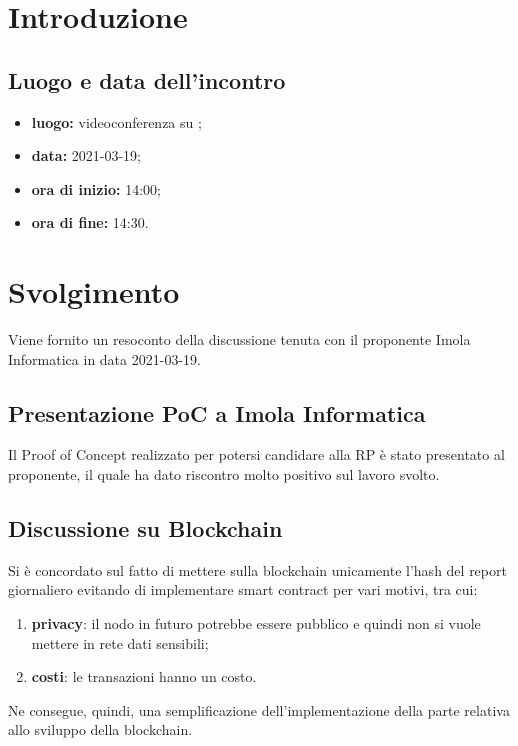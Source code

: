 \section*{Introduzione}
\subsection*{Luogo e data dell'incontro}
\begin{itemize}
	\item \textbf{luogo:} videoconferenza su ;
	\item \textbf{data:} 2021-03-19;
	\item \textbf{ora di inizio:} 14:00;
	\item \textbf{ora di fine:} 14:30.
\end{itemize}
\section{Svolgimento}
Viene fornito un resoconto della discussione tenuta con il proponente Imola Informatica in data 2021-03-19.

\subsection*{Presentazione PoC a Imola Informatica}
Il Proof of Concept realizzato per potersi candidare alla RP è stato presentato al proponente, il quale ha dato riscontro molto positivo sul lavoro svolto.

\subsection*{Discussione su Blockchain}
Si è concordato sul fatto di mettere sulla blockchain unicamente l'hash del report giornaliero evitando di implementare smart contract per vari motivi, tra cui:
\begin{enumerate}
	\item \textbf{privacy}: il nodo in futuro potrebbe essere pubblico e quindi non si vuole mettere in rete dati sensibili;
	\item \textbf{costi}: le transazioni hanno un costo.
\end{enumerate}
Ne consegue, quindi, una semplificazione dell'implementazione della parte relativa allo sviluppo della blockchain.





